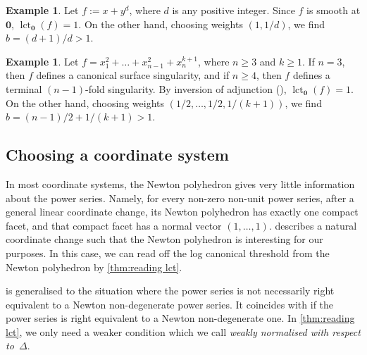 \documentclass[a4paper, 12pt, oneside]{article}
\theoremstyle{plain}
\theoremstyle{definition}
\newtheorem{example}[theorem]{Example}
\theoremstyle{remark}
\numberwithin{theorem}{section}
\numberwithin{table}{section}
\numberwithin{equation}{theorem}
\begin{document}
\begin{example} \label{exa:counter-example smooth}
Let $f := x + y^d$, where $d$ is any positive integer. Since $f$ is smooth at $\bm 0$, $\operatorname{lct}_{\bm 0}(f) = 1$. On the other hand, choosing weights $(1, 1/d)$, we find $b = (d+1)/d > 1$.
\end{example}

\begin{example} \label{exa:counter-example Ak}
Let $f = x_1^2 + \ldots + x_{n-1}^2 + x_n^{k+1}$, where $n \geq 3$ and $k \geq 1$. If $n = 3$, then $f$ defines a canonical surface singularity, and if $n \geq 4$, then $f$ defines a terminal $(n-1)$-fold singularity. By inversion of adjunction (\cite[Theorem~7.5]{Kol97}), $\operatorname{lct}_{\bm 0}(f) = 1$. On the other hand, choosing weights $(1/2, \ldots, 1/2, 1/(k+1))$, we find $b = (n-1)/2 + 1/(k+1) > 1$.
\end{example}

\subsection{Choosing a coordinate system}

In most coordinate systems, the Newton polyhedron gives very little information about the power series. Namely, for every non-zero non-unit power series, after a general linear coordinate change, its Newton polyhedron has exactly one compact facet, and that compact facet has a normal vector $(1, \ldots, 1)$.  describes a natural coordinate change such that the Newton polyhedron is interesting for our purposes. In this case, we can read off the log canonical threshold from the Newton polyhedron by \cref{thm:reading lct}.

 is \cite[Definition~3.24]{BMP20} generalised to the situation where the power series is not necessarily right equivalent to a Newton non-degenerate power series. It coincides with \cite[Definition~3.24]{BMP20} if the power series is right equivalent to a Newton non-degenerate one. In \cref{thm:reading lct}, we only need a weaker condition which we call \emph{weakly normalised with respect to~$\Delta$}.
\end{document}
